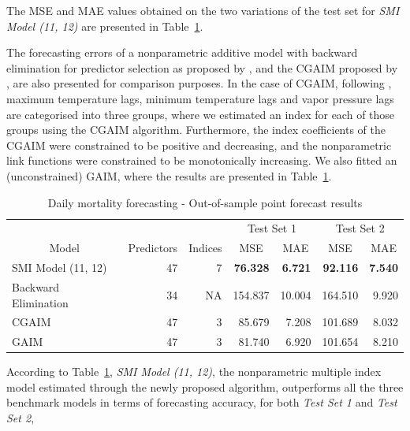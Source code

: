 \documentclass[11pt,a4paper,]{article}
\begin{document}
The MSE and MAE values obtained on the two variations of the test set
for \emph{SMI Model (11, 12)} are presented in Table~\ref{tbl-heat}.

The forecasting errors of a nonparametric additive model with backward
elimination for predictor selection as proposed by \textcite{FH2012},
and the CGAIM proposed by \textcite{Masselot2022}, are also presented
for comparison purposes. In the case of CGAIM, following
\textcite{Masselot2022}, maximum temperature lags, minimum temperature
lags and vapor pressure lags are categorised into three groups, where we
estimated an index for each of those groups using the CGAIM algorithm.
Furthermore, the index coefficients of the CGAIM were constrained to be
positive and decreasing, and the nonparametric link functions were
constrained to be monotonically increasing. We also fitted an
(unconstrained) GAIM, where the results are presented in
Table~\ref{tbl-heat}.

\hypertarget{tbl-heat}{}
\begin{table}[!h]
\caption{\label{tbl-heat}Daily mortality forecasting - Out-of-sample point forecast results }\tabularnewline

\centering
\begin{tabular}{lrr>{}r>{}r>{}r>{}r}
\toprule
\multicolumn{1}{c}{} & \multicolumn{1}{c}{} & \multicolumn{1}{c}{} & \multicolumn{2}{c}{Test Set 1} & \multicolumn{2}{c}{Test Set 2} \\
\cmidrule(l{3pt}r{3pt}){4-5} \cmidrule(l{3pt}r{3pt}){6-7}
\multicolumn{1}{c}{Model} & \multicolumn{1}{c}{Predictors} & \multicolumn{1}{c}{Indices} & \multicolumn{1}{c}{MSE} & \multicolumn{1}{c}{MAE} & \multicolumn{1}{c}{MSE} & \multicolumn{1}{c}{MAE}\\
\midrule
SMI Model (11, 12) & 47 & 7 & \textbf{76.328} & \textbf{6.721} & \textbf{92.116} & \textbf{7.540}\\
Backward Elimination & 34 & NA & 154.837 & 10.004 & 164.510 & 9.920\\
CGAIM & 47 & 3 & 85.679 & 7.208 & 101.689 & 8.032\\
GAIM & 47 & 3 & 81.740 & 6.920 & 101.654 & 8.210\\
\bottomrule
\end{tabular}
\end{table}

According to Table~\ref{tbl-heat}, \emph{SMI Model (11, 12)}, the
nonparametric multiple index model estimated through the newly proposed
algorithm, outperforms all the three benchmark models in terms of
forecasting accuracy, for both \emph{Test Set 1} and \emph{Test Set 2},
\end{document}
